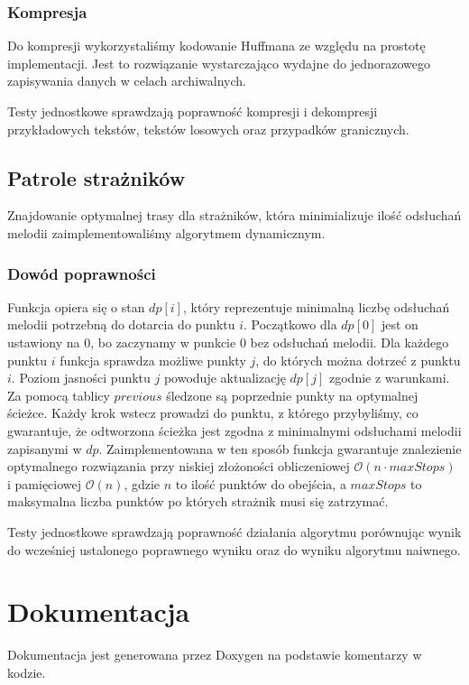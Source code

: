 \documentclass{article}
\begin{document}
\subsubsection{Kompresja}
Do kompresji wykorzystaliśmy kodowanie Huffmana ze względu na prostotę implementacji.
Jest to rozwiązanie wystarczająco wydajne
do jednorazowego zapisywania danych w celach archiwalnych.

\noindent Testy jednostkowe sprawdzają poprawność kompresji i dekompresji
przykładowych tekstów, tekstów losowych oraz przypadków granicznych.

\subsection{Patrole strażników}
Znajdowanie optymalnej trasy dla strażników, która minimializuje ilość odsłuchań melodii
zaimplementowaliśmy algorytmem dynamicznym.
\subsubsection{Dowód poprawności}
Funkcja opiera się o stan \(dp[i]\), który reprezentuje minimalną liczbę odsłuchań
melodii potrzebną do dotarcia do punktu \(i\). Początkowo dla \(dp[0]\) jest on ustawiony na 0,
bo zaczynamy w punkcie 0 bez odsłuchań melodii.
Dla każdego punktu \(i\) funkcja sprawdza możliwe punkty \(j\), do których można dotrzeć z punktu \(i\).
Poziom jasności punktu \(j\) powoduje aktualizację \(dp[j]\) zgodnie z warunkami. Za pomocą tablicy \(previous\)
śledzone są poprzednie punkty na optymalnej ścieżce. Każdy krok wstecz prowadzi do punktu, z którego
przybyliśmy, co gwarantuje, że odtworzona ścieżka jest zgodna z minimalnymi odsłuchami melodii
zapisanymi w \(dp\). Zaimplementowana w ten sposób funkcja gwarantuje znalezienie optymalnego rozwiązania
przy niskiej złożoności obliczeniowej \(\mathcal{O}(n \cdot maxStops)\) i pamięciowej \(\mathcal{O}(n)\),
gdzie \(n\) to ilość punktów do obejścia, a \(maxStops\) to
maksymalna liczba punktów po których strażnik musi się zatrzymać.

\noindent Testy jednostkowe sprawdzają poprawność działania algorytmu porównując wynik
do wcześniej ustalonego poprawnego wyniku oraz do wyniku algorytmu naiwnego.
\section{Dokumentacja}
Dokumentacja jest generowana przez Doxygen na podstawie komentarzy w kodzie.

\printbibliography[heading=bibnumbered]
\end{document}

